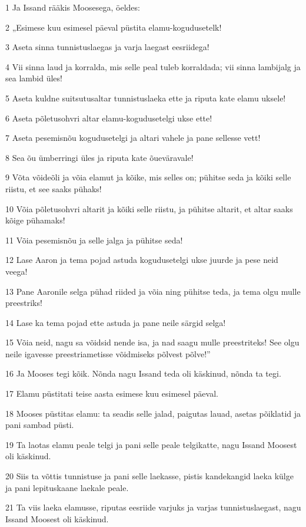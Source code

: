 \par 1 Ja Issand rääkis Moosesega, öeldes:
\par 2 „Esimese kuu esimesel päeval püstita elamu-kogudusetelk!
\par 3 Aseta sinna tunnistuslaegas ja varja laegast eesriidega!
\par 4 Vii sinna laud ja korralda, mis selle peal tuleb korraldada; vii sinna lambijalg ja sea lambid üles!
\par 5 Aseta kuldne suitsutusaltar tunnistuslaeka ette ja riputa kate elamu uksele!
\par 6 Aseta põletusohvri altar elamu-kogudusetelgi ukse ette!
\par 7 Aseta pesemisnõu kogudusetelgi ja altari vahele ja pane sellesse vett!
\par 8 Sea õu ümberringi üles ja riputa kate õueväravale!
\par 9 Võta võideõli ja võia elamut ja kõike, mis selles on; pühitse seda ja kõiki selle riistu, et see saaks pühaks!
\par 10 Võia põletusohvri altarit ja kõiki selle riistu, ja pühitse altarit, et altar saaks kõige pühamaks!
\par 11 Võia pesemisnõu ja selle jalga ja pühitse seda!
\par 12 Lase Aaron ja tema pojad astuda kogudusetelgi ukse juurde ja pese neid veega!
\par 13 Pane Aaronile selga pühad riided ja võia ning pühitse teda, ja tema olgu mulle preestriks!
\par 14 Lase ka tema pojad ette astuda ja pane neile särgid selga!
\par 15 Võia neid, nagu sa võidsid nende isa, ja nad saagu mulle preestriteks! See olgu neile igavesse preestriametisse võidmiseks põlvest põlve!”
\par 16 Ja Mooses tegi kõik. Nõnda nagu Issand teda oli käskinud, nõnda ta tegi.
\par 17 Elamu püstitati teise aasta esimese kuu esimesel päeval.
\par 18 Mooses püstitas elamu: ta seadis selle jalad, paigutas lauad, asetas põiklatid ja pani sambad püsti.
\par 19 Ta laotas elamu peale telgi ja pani selle peale telgikatte, nagu Issand Moosest oli käskinud.
\par 20 Siis ta võttis tunnistuse ja pani selle laekasse, pistis kandekangid laeka külge ja pani lepituskaane laekale peale.
\par 21 Ta viis laeka elamusse, riputas eesriide varjuks ja varjas tunnistuslaegast, nagu Issand Moosest oli käskinud.

